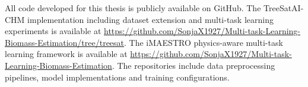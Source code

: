 All code developed for this thesis is publicly available on GitHub. The TreeSatAI-CHM implementation including dataset extension and multi-task learning experiments is available at \url{https://github.com/SonjaX1927/Multi-task-Learning-Biomass-Estimation/tree/treesat}. The iMAESTRO physics-aware multi-task learning framework is available at \url{https://github.com/SonjaX1927/Multi-task-Learning-Biomass-Estimation}. The repositories include data preprocessing pipelines, model implementations and training configurations.
